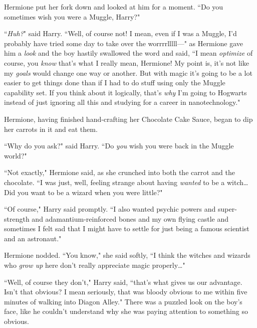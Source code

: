 Hermione put her fork down and looked at him for a moment. ``Do you sometimes wish you were a Muggle, Harry?"

``\emph{Huh?}" said Harry. ``Well, of course not! I mean, even if I was a Muggle, I'd probably have tried some day to take over the worrrrlllll—" as Hermione gave him a \emph{look} and the boy hastily swallowed the word and said, ``I mean \emph{optimize} of course, you \emph{know} that's what I really mean, Hermione! My point is, it's not like my \emph{goals} would change one way or another. But with magic it's going to be a lot easier to get things done than if I had to do stuff using only the Muggle capability set. If you think about it logically, that's \emph{why} I'm going to Hogwarts instead of just ignoring all this and studying for a career in nanotechnology."

Hermione, having finished hand-crafting her Chocolate Cake Sauce, began to dip her carrots in it and eat them.

``Why do you ask?" said Harry. ``Do \emph{you} wish you were back in the Muggle world?"

``Not exactly," Hermione said, as she crunched into both the carrot and the chocolate. ``I was just, well, feeling strange about having \emph{wanted} to be a witch{\ldots} Did you want to be a wizard when you were little?"

``Of course," Harry said promptly. ``I also wanted psychic powers and super-strength and adamantium-reinforced bones and my own flying castle and sometimes I felt sad that I might have to settle for just being a famous scientist and an astronaut."

Hermione nodded. ``You know," she said softly, ``I think the witches and wizards who \emph{grow up} here don't really appreciate magic properly{\ldots}"

``Well, of course they don't," Harry said, ``that's what gives us our advantage. Isn't that obvious? I mean seriously, that was bloody obvious to me within five minutes of walking into Diagon Alley." There was a puzzled look on the boy's face, like he couldn't understand why she was paying attention to something so obvious.

